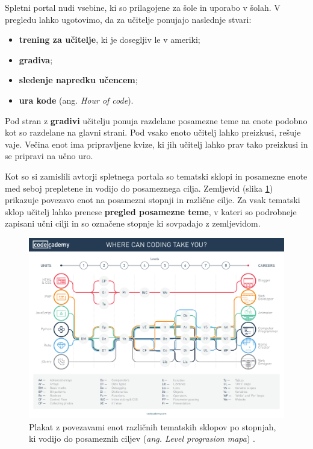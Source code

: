Spletni portal nudi vsebine, ki so prilagojene za šole in uporabo v
šolah. V pregledu lahko ugotovimo, da za učitelje ponujajo naslednje
stvari:

\begin{itemize}
\item \textbf{trening za učitelje}, ki je dosegljiv le v ameriki;
\item \textbf{gradiva};
\item \textbf{sledenje napredku učencem};
\item \textbf{ura kode} (ang. \emph{Hour of code}).
\end{itemize}

Pod stran z \textbf{ gradivi} %
učitelju ponuja razdelane posamezne teme na enote podobno kot so
razdelane na glavni strani. Pod vsako enoto učitelj lahko preizkusi,
rešuje vaje. Večina enot ima pripravljene kvize, ki jih učitelj lahko
prav tako preizkusi in se pripravi na učno uro.


Kot so si zamislili avtorji spletnega portala so tematski sklopi in
posamezne enote med seboj prepletene in vodijo do posameznega
cilja. Zemljevid (slika \ref{fig:codeacademy:poster}) prikazuje
povezavo enot na posamezni stopnji in različne cilje. Za vsak tematski
sklop učitelj lahko prenese \textbf{pregled posamezne teme}, v kateri
so podrobneje zapisani učni cilji in so označene stopnje ki sovpadajo
z zemljevidom.

\begin{figure}[h!]
  \centering
    \includegraphics [width=1\linewidth, keepaspectratio =
   1] {./images/CAdemy-poster.pdf}
   \caption{Plakat z povezavami enot različnih tematskih sklopov po
     stopnjah, ki vodijo  do posameznih ciljev (\emph{ang. Level
       prograsion mapa}) \cite{web:codeacademy}.}
    \label{fig:codeacademy:poster}
\end{figure}

